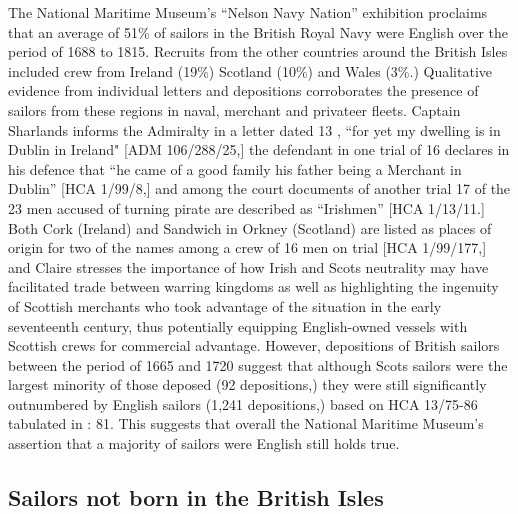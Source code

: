 The National Maritime Museum’s “Nelson Navy Nation” exhibition proclaims that an average of 51\% of sailors in the British Royal Navy were English over the period of 1688 to 1815. Recruits from the other countries around the British Isles included crew from Ireland (19\%) Scotland (10\%) and Wales (3\%.) Qualitative evidence from individual letters and depositions corroborates the presence of sailors from these regions in naval, merchant and privateer fleets. Captain Sharlands informs the Admiralty in a letter dated 13 \citealt{April1673}, “for yet my dwelling is in Dublin in Ireland" [ADM 106/288/25,] the defendant in one trial of 16 \citealt{August1727} declares in his defence that “he came of a good family his father being a Merchant in Dublin” [HCA 1/99/8,] and among the court documents of another trial 17 of the 23 men accused of turning pirate are described as “Irishmen” [HCA 1/13/11.] Both Cork (Ireland) and Sandwich in Orkney (Scotland) are listed as places of origin for two of the names among a crew of 16 men on trial [HCA 1/99/177,] and Claire \citet{McLoughlin2015} stresses the importance of how Irish and Scots neutrality may have facilitated trade between warring kingdoms as well as highlighting the ingenuity of Scottish merchants who took advantage of the situation in the early seventeenth century, thus potentially equipping English-owned vessels with Scottish crews for commercial advantage. However, depositions of British sailors between the period of 1665 and 1720 suggest that although Scots sailors were the largest minority of those deposed (92 depositions,) they were still significantly outnumbered by English sailors (1,241 depositions,) based on HCA 13/75-86 tabulated in \citealt{Earle1993}: 81. This suggests that overall the National Maritime Museum’s assertion that a majority of sailors were English still holds true.  

\subsection{\textbf{Sailors} \textbf{not} \textbf{born} \textbf{in} \textbf{the} \textbf{British} \textbf{Isles}}%

